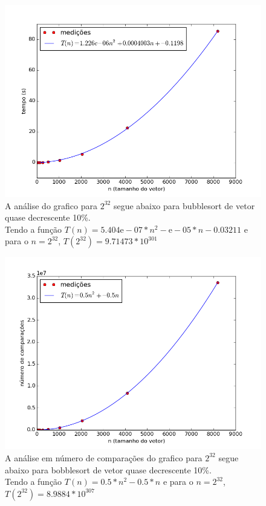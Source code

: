 \documentclass[12pt,a4paper,twoside]{report}
\begin{document}


\begin{figure}[ht]
\centering \includegraphics[scale=0.8]{../bolha/imagens/bolhaQuaseDecresc100.png}
\caption{A análise do grafico para $2^{32}$ segue abaixo para bubblesort de vetor quase decrescente 10\%.\\
Tendo a função $T(n) = 5.404\mathrm{e}-07*n^2-\mathrm{e}-05*n-0.03211$ e para o $n =2^{32}$, $T(2^{32}) = 9.71473 * 10^{301}$}
\label{fig:bolhaQuaseDecresc100}
\end{figure}

\begin{figure}[ht]
\centering \includegraphics[scale=0.8]{../bolha/imagens/bolhaQuaseDecresc101.png}
\caption{A análise em número de comparações do grafico para $2^{32}$ segue abaixo para bobblesort de vetor quase decrescente 10\%.\\
Tendo a função $T(n) = 0.5*n^2 - 0.5*n$ e para o $n =2^{32}$, $T(2^{32}) = 8.9884 * 10^{307}$}
\label{fig:bolhaQuaseDecresc101}
\end{figure}
\end{document}
